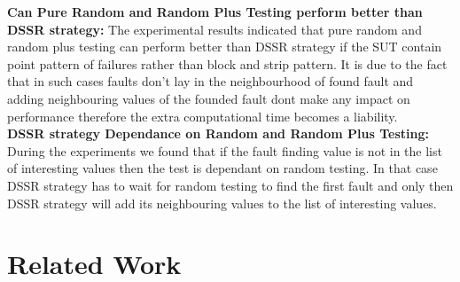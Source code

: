 \documentclass[conference]{IEEEtran}
\begin{document}
\indent \textbf{Can Pure Random and Random Plus Testing perform better than DSSR strategy:}
The experimental results indicated that pure random and random plus testing can perform better than DSSR strategy if the SUT contain point pattern of failures rather than block and strip pattern. It is due to the fact that in such cases faults don't lay in the neighbourhood of found fault and adding neighbouring values of the founded fault dont make any impact on performance therefore the extra computational time becomes a liability.\\
\indent \textbf{DSSR strategy Dependance on Random and Random Plus Testing:}
During the experiments we found that if the fault finding value is not in the list of interesting values then the test is dependant on random testing. In that case DSSR strategy has to wait for random testing to find the first fault and only then DSSR strategy will add its neighbouring values to the list of interesting values.



\section{Related Work}\label{sec:rw}
\end{document}
